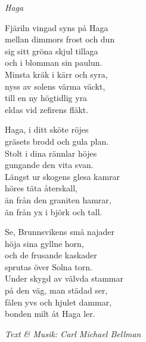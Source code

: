 {\footnotesize\textit{Haga}}\par
\vspace{10pt}
Fjäriln vingad syns på Haga\\
mellan dimmors frost och dun\\
sig sitt gröna skjul tillaga\\
och i blomman sin paulun.\\
Minsta kräk i kärr och syra,\\
nyss av solens värma väckt,\\
till en ny högtidlig yra\\
eldas vid zefirens fläkt.\par
\vspace{10pt}
Haga, i ditt sköte röjes\\
gräsets brodd och gula plan.\\
Stolt i dina rännlar höjes\\
gungande den vita svan.\\
Längst ur skogens glesa kamrar\\
höres täta återskall,\\
än från den graniten hamrar,\\
än från yx i björk och tall.\par
\vspace{10pt}
Se, Brunnsvikens små najader\\
höja sina gyllne horn,\\
och de frusande kaskader\\
sprutas över Solna torn.\\
Under skygd av välvda stammar\\
på den väg, man städad ser,\\
fålen yvs och hjulet dammar,\\
bonden milt åt Haga ler.\par
\vspace{10pt}
{\footnotesize\textit{Text \& Musik: Carl Michael Bellman}}
